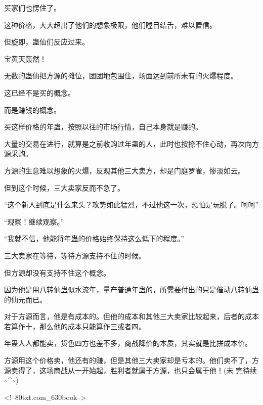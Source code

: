 \begin{this_body}
买家们也愣住了。

这种价格，大大超出了他们的想象极限，他们瞠目结舌，难以置信。

但旋即，蛊仙们反应过来。

宝黄天轰然！

无数的蛊仙把方源的摊位，团团地包围住，场面达到前所未有的火爆程度。

这已经不是买的概念。

而是赚钱的概念。

买这样价格的年蛊，按照以往的市场行情，自己本身就是赚的。

大量的交易在进行，就算是之前收购过年蛊的人，此时也按捺不住心动，再次向方源采购。

方源的生意难以想象的火爆，反观其他三大卖方，却是门庭罗雀，惨淡如云。

但到这个时候，三大卖家反而不急了。

“这个新人到底是什么来头？攻势如此猛烈，不过他这一次，恐怕是玩脱了。呵呵”

“观察！继续观察。”

“我就不信，他能将年蛊的价格始终保持这么低下的程度。”

三大卖家在等待，等待方源支持不住的时候。

但方源却没有支持不住这个概念。

因为他是用八转仙蛊似水流年，量产普通年蛊的，所需要付出的只是催动八转仙蛊的仙元而已。

对于方源而言，他是有成本的。但他的成本和其他三大卖家比较起来，后者的成本若算作十，那么他的成本只能算作三或者四。

年蛊人人都能卖，货色四方也差不多，商战降价的本质，其实就是比拼成本价。

方源用这个价格卖，他还有的赚，但是其他三大卖家却是亏本的。他们卖不了，方源卖得了，这场商战从一开始起，胜利者就属于方源，也只会属于他！(未 完待续 \~{}\^{}\~{})

<!--80txt.com\_630book-->

\end{this_body}

